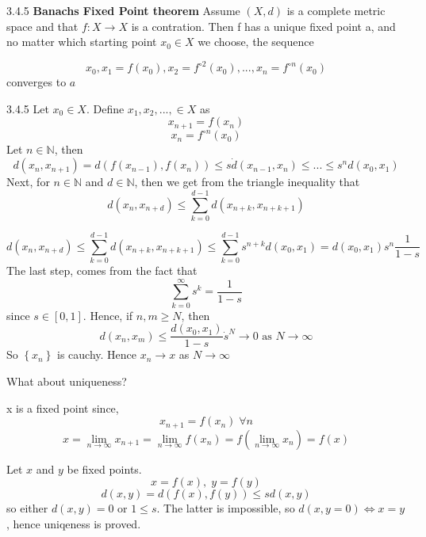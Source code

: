 \documentclass[a4paper,norsk]{article}
\renewcommand{\geq}{\geqslant}
\renewcommand{\leq}{\leqslant}
\begin{document}
\begin{theorembox}{3.4.5 \textbf{Banachs Fixed Point theorem}}{}
Assume $ \left( X, d \right)  $ is a complete metric space and that $ f: X \to X $ is a contration. Then f has a unique fixed point a, and no matter which starting point $ x_0 \in X $ we choose, the sequence

\[
    x_0, x_1 =f(x_0), x_2 = f^{\circ 2} (x_0), ..., x_n = f^{\circ n} (x_0)
\]
converges to $ a $ 

\begin{proofbox}{3.4.5}{}
  Let $ x_0 \in  X $. Define $ x_1, x_2, ..., \in  X $ as 
  \[
      x_{n+1} = f(x_n)
  \]
  \[
      x_n = f^{\circ n} (x_0)
  \]
  Let $ n \in \mathbb{N} $, then
  \[
      d \left( x_n, x_{n+1} \right) = d \left( f(x_{n-1}), f(x_n) \right) \leq s \dot d \left( x_{n-1}, x_n \right)  \leq ... \leq s^n d \left( x_0, x_1 \right) 
  \]
  Next, for $ n \in \mathbb{N} $ and $ d \in \mathbb{N} $, then we get from the triangle inequality that
  \[
      d(x_n, x_{n+d}) \leq \sum_{k=0}^{d-1} d \left( x_{n+k}, x_{n+k+1} \right) 
  \]

  \[
      d \left( x_n, x_{n+d} \right) \leq \sum_{k=0}^{d-1} d \left( x_{n+k}, x_{n+k+1} \right)  \leq \sum_{k=0}^{d-1} s^{n+k} d \left( x_0, x_1 \right) = d \left( x_0, x_1 \right) s^n \frac{ 1 }{ 1-s }
  \]
  The last step, comes from the fact that
  \[
      \sum_{k=0}^{\infty} s^k = \frac{ 1 }{ 1-s }
  \]
  since $ s \in \left[ 0, 1 \right]  $. Hence, if $ n, m \geq N $, then
  \[
      d \left( x_n, x_m  \right) \leq \frac{ d \left( x_0, x_1 \right)  }{ 1-s } \dot s^N \to 0 \text{ as } N \to \infty
  \]
  So $ \left\{ x_n \right\}  $ is cauchy. Hence $ x_n \to x $ as $ N \to \infty $ 

  What about uniqueness?

  x is a fixed point since, 
  \[
      x_{n+1} = f(x_n) \; \forall n
  \]
  \[
      x = \lim_{n \to \infty} x_{n+1} = \lim_{n \to \infty} f(x_n) = f \left( \lim_{n \to \infty} x_n \right) = f(x)
  \]
  
  Let $ x $ and $ y $  be fixed points. 
  \[
      x = f(x), \; y = f(y)
  \]
  \[
      d(x,y) = d \left( f(x), f(y) \right) \leq s d \left( x, y \right) 
  \]
  so either $ d \left( x, y  \right) = 0 $ or $ 1 \leq s $. The latter is impossible, so $ d \left( x, y = 0 \right) \iff x = y  $, hence uniqeness is proved.
  
\end{proofbox}
\end{theorembox}
\end{document}
